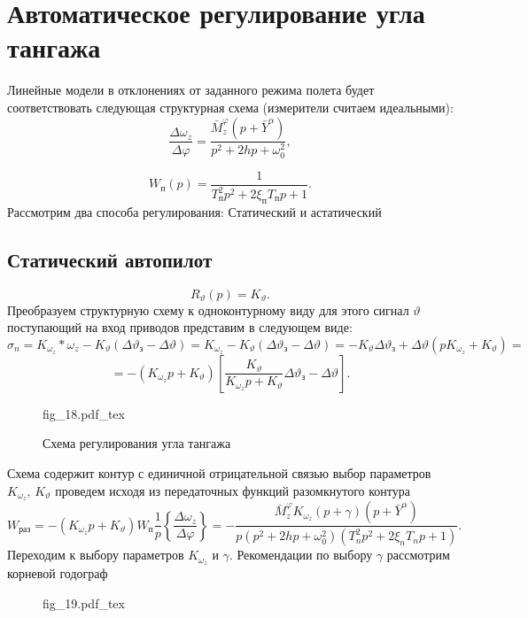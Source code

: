 \documentclass{article}
\begin{document}
\section{Автоматическое регулирование угла тангажа}
Линейные модели в отклонениях от заданного режима полета будет соответствовать
следующая структурная схема (измерители считаем идеальными):
\[
	\frac{\Delta \omega_z}{\Delta \varphi} = \frac{\bar{M}_z^\varphi
		(p+\bar{Y}^\alpha)}{p^2 + 2hp + \omega_{0}^2},
\]

\[
	W_\text{п}(p) = \frac{1}{T_\text{п}^2 p^2 + 2 \xi_\text{п} T_\text{п} p +
		1}.
\]
Рассмотрим два способа регулирования:
Статический и астатический


\subsection{Статический автопилот}
\[
	R_{\vartheta}(p)= K_\vartheta.
\]
Преобразуем структурную схему к одноконтурному виду для этого сигнал
$\vartheta$ поступающий на вход приводов представим в следующем виде:
\[
	\sigma_n = K_{\omega_z}*\omega_z - K_\vartheta (\Delta \vartheta_\text{з} -
	\Delta \vartheta) = K_{\omega_z} - K_{\vartheta}(\Delta \vartheta_\text{з}
	- \Delta \vartheta) = -K_{\vartheta} \Delta \vartheta_\text{з} + \Delta
	\vartheta(p K_{\omega_z} + K_{\vartheta}) =
\]
\[
	= -(K_{\omega_z}p + K_\vartheta)\left[\frac{K_\vartheta}{K_{\omega_z}p +
			K_{\vartheta}}\Delta\vartheta_\text{з} - \Delta \vartheta\right].
\]

\begin{figure}[ht]
	\centering
	{fig_18.pdf_tex}
	\caption{Схема регулирования угла тангажа}
	\label{fig:18}
\end{figure}

Схема содержит контур с единичной отрицательной связью выбор параметров
$K_{\omega_z}, \, K_{\vartheta}$ проведем исходя из передаточных функций
разомкнутого контура
\[
	W_\text{раз} = -(K_{\omega_z} p + K_\vartheta) W_\text{п}
	\frac{1}{p}\left\{{\frac{\Delta \omega_z}{\Delta \varphi}}\right\} =
	-\frac{\bar{M}_z^\varphi K_{\omega_{z}}(p + \gamma)(p +
		\bar{Y}^\alpha)}{p(p^2 + 2hp + \omega_0^2)(T_n^2 p^2 + 2 \xi_n T_n p +1)}.
\]
Переходим к выбору параметров $K_{\omega_z}$ и $\gamma$.
Рекомендации по выбору $\gamma$ рассмотрим корневой годограф

\begin{figure}[H]
	\centering
	{fig_19.pdf_tex}
\end{figure}
\end{document}
